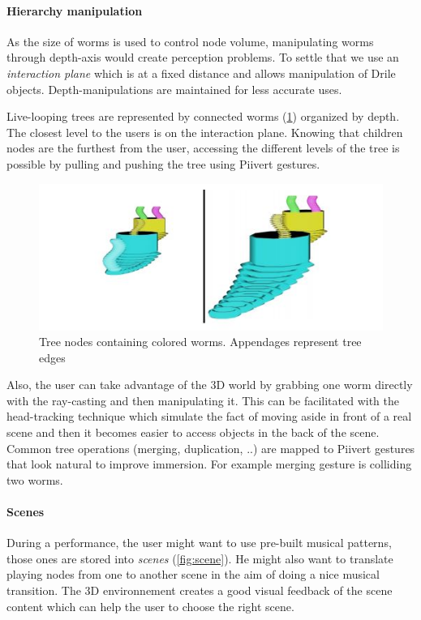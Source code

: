 \paragraph{Hierarchy manipulation}  
As the size of worms is used to control node volume, manipulating worms through depth-axis would create perception problems. To settle that we use an \textit{interaction plane} which is at a fixed distance and allows manipulation of Drile objects. Depth-manipulations are maintained for less accurate uses.

Live-looping trees are represented by connected worms (\ref{fig:worm}) organized by depth. The closest level to the users is on the interaction plane.
Knowing that children nodes are the furthest from the user, accessing the different levels of the tree is possible by pulling and pushing the tree using Piivert gestures. 

\begin{figure}[h!]
\centering\includegraphics[scale=0.3]{image/worm.JPG}
\caption{Tree nodes containing colored worms. Appendages represent tree edges}
\label{fig:worm}
\end{figure} 

 Also, the user can take advantage of the 3D world by grabbing one worm directly with the ray-casting and then manipulating it. This can be facilitated with the head-tracking technique which simulate the fact of moving aside in front of a real scene and then it becomes easier to access objects in the back of the scene. 
 Common tree operations (merging, duplication, ..) are mapped to Piivert gestures that look natural to improve immersion. For example merging gesture is colliding two worms.

\paragraph{Scenes}  

During a performance, the user might want to use pre-built musical patterns, those ones are stored into \textit{scenes} (\ref{fig:scene}). He might also want to translate playing nodes from one to another scene in the aim of doing a nice musical transition. The 3D environnement creates a good visual feedback of the scene content which can help the user to choose the right scene.

